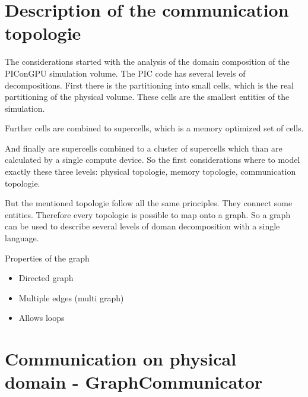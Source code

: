 \section{Description of the communication topologie}
The considerations started with the analysis of the domain composition
of the PIConGPU simulation volume. The PIC code has several levels
of decompositions. First there is the partitioning into small cells, which
is the real partitioning of the physical volume. These cells are the smallest
entities of the simulation. 

Further cells are combined to supercells, which is a memory optimized set
of cells.

And finally are supercells combined to a cluster of supercells which than 
are calculated by a single compute device. So the first considerations
where to model exactly these three levels: physical topologie, memory topologie,
communication topologie.

But the mentioned topologie follow all the same principles. They connect some
entities. Therefore every topologie is possible to map onto a graph.
So a graph can be used to describe several levels of doman decomposition
with a single language.

Properties of the graph 
\begin{itemize}
  \item Directed graph
  \item Multiple edges (multi graph)
  \item Allows loops
\end{itemize}


\section{Communication on physical domain - GraphCommunicator}

